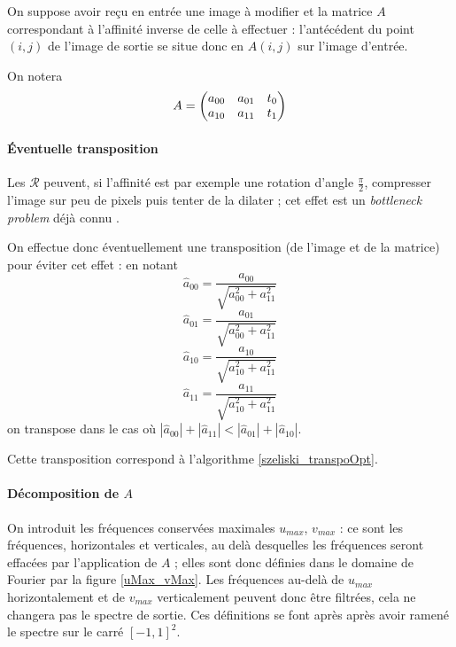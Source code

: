 	On suppose avoir reçu en entrée une image à modifier et la matrice $A$ correspondant à l'affinité inverse de celle à effectuer : l'antécédent du point $(i,j)$ de l'image de sortie se situe donc en $A(i,j)$ sur l'image d'entrée.
	
	On notera
	\[A = \begin{pmatrix} a_{00} & a_{01} & t_0\\ a_{10} & a_{11} & t_1 \end{pmatrix}\]
	
	\paragraph{Éventuelle transposition}
		\label{szeliski_transpoOpt_section}
		
		Les $\mathcal R$ peuvent, si l'affinité est par exemple une rotation d'angle $\frac{\pi}{2}$, compresser l'image sur peu de pixels puis tenter de la dilater ; cet effet est un \emph{bottleneck problem} déjà connu \cite{wolberg1990digital}.
		
		On effectue donc éventuellement une transposition (de l'image et de la matrice) pour éviter cet effet : en notant
		\[\hat a_{00} = \frac{a_{00}}{\sqrt{a_{00}^2+a_{11}^2}}\]
		\[\hat a_{01} = \frac{a_{01}}{\sqrt{a_{00}^2+a_{11}^2}}\]
		\[\hat a_{10} = \frac{a_{10}}{\sqrt{a_{10}^2+a_{11}^2}}\]
		\[\hat a_{11} = \frac{a_{11}}{\sqrt{a_{10}^2+a_{11}^2}}\]
		on transpose dans le cas où $|\hat a_{00}|+|\hat a_{11}|<|\hat a_{01}|+|\hat a_{10}|$.
		
		Cette transposition correspond à l'algorithme \ref{szeliski_transpoOpt}.
		
	\paragraph{Décomposition de $A$}
		\label{szeliski_decompositionDeA_section}
		\label{szeliski_frequencesMax_section}
		On introduit les fréquences conservées maximales $u_{max}$, $v_{max}$ : ce sont les fréquences, horizontales et verticales, au delà desquelles les fréquences seront effacées par l'application de $A$ ; elles sont donc définies dans le domaine de Fourier par la figure \ref{uMax_vMax}. Les fréquences au-delà de $u_{max}$ horizontalement et de $v_{max}$ verticalement peuvent donc être filtrées, cela ne changera pas le spectre de sortie. Ces définitions se font après après avoir ramené le spectre sur le carré $[-1,1]^2$.
		
